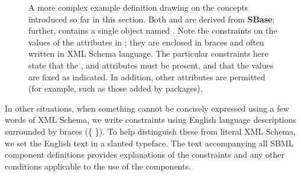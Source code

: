 \begin{figure}[bh]
  \centering
  \small
  \vspace*{1ex}
  \caption{A more complex example definition drawing on the
    concepts introduced so far in this section.  Both 
    and  are derived from \textup{\textbf{\textsf{SBase}}};
    further,  contains a single  object
    named .  Note the constraints on the values of
    the attributes in ; they are enclosed in braces
    and often written in XML Schema language.  The particular
    constraints here state that the , 
    and  attributes must be present, and that the
    values are fixed as indicated.  In addition, other attributes
    are permitted (for example, such as those added by \thisL
    packages).}
  \label{fig:unit-eg}
\end{figure}

In other situations, when something cannot be concisely expressed
using a few words of XML Schema, we write constraints using
English language descriptions surrounded by braces (\{ \}).  To
help distinguish these from literal XML Schema, we set the English
text in a slanted typeface.  The text accompanying all SBML
component definitions provides explanations of the constraints and
any other conditions applicable to the use of the components.


%
%
%
%
